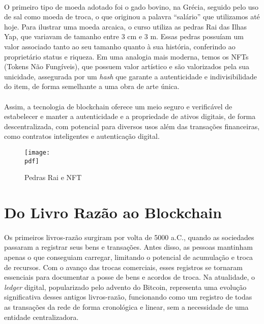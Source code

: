 \documentclass[letterpaper,11pt,leqno]{article}
\newcommand{\pdf}{figures/figures}
\newcommand{\quotes}[1]{``#1''}
\begin{document}
\paragraph{}
O primeiro tipo de moeda adotado foi o gado bovino, na Grécia, seguido pelo uso
de sal como moeda de troca, o que originou a palavra \quotes{salário} que
utilizamos até hoje. Para ilustrar uma moeda arcaica, o curso utiliza as pedras
Rai das Ilhas Yap, que variavam de tamanho entre 3 \unit{\centi\metre} e 3
\unit{\metre}. Essas pedras possuíam um valor associado tanto ao seu tamanho
quanto à sua história, conferindo ao proprietário status e riqueza. Em uma
analogia mais moderna, temos os NFTs (Tokens Não Fungíveis), que possuem valor
artístico e são valorizados pela sua unicidade, assegurada por um \textit{hash}
que garante a autenticidade e indivisibilidade do item, de forma semelhante a
uma obra de arte única.

\paragraph{}
Assim, a tecnologia de blockchain oferece um meio seguro e verificável de
estabelecer e manter a autenticidade e a propriedade de ativos digitais, de
forma descentralizada, com potencial para diversos usos além das transações
financeiras, como contratos inteligentes e autenticação digital.

\begin{figure}[H]
	{\texttt{[image: \\pdf]}}
	\caption{Pedras Rai e NFT}
	\label{f:figure1}\end{figure}

\section{Do Livro Razão ao Blockchain}

\paragraph{}
Os primeiros livros-razão surgiram por volta de \num{5000} a.C., quando as
sociedades passaram a registrar seus bens e transações. Antes disso, as pessoas
mantinham apenas o que conseguiam carregar, limitando o potencial de acumulação
e troca de recursos. Com o avanço das trocas comerciais, esses registros se
tornaram essenciais para documentar a posse de bens e acordos de troca. Na
atualidade, o \textit{ledger} digital, popularizado pelo advento do Bitcoin,
representa uma evolução significativa desses antigos livros-razão, funcionando
como um registro de todas as transações da rede de forma cronológica e linear,
sem a necessidade de uma entidade centralizadora.
\end{document}
